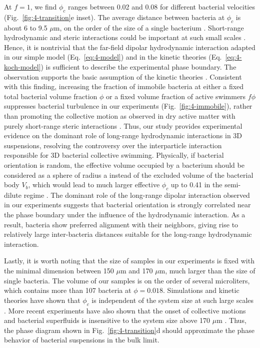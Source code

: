 At $f = 1$, we find $\phi_c$ ranges between 0.02 and 0.08 for different bacterial velocities (Fig.~\ref{fig:4-transition}e inset). The average distance between bacteria at $\phi_c$ is about 6 to 9.5 $\mu$m, on the order of the size of a single bacterium \cite{Berg2004}. Short-range hydrodynamic and steric interactions could be important at such small scales \cite{Aranson2007, Ezhilan2013}. Hence, it is nontrivial that the far-field dipolar hydrodynamic interaction adapted in our simple model (Eq.~\ref{eq:4-model}) and in the kinetic theories (Eq.~\ref{eq:4-koch-model}) is sufficient to describe the experimental phase boundary.
The observation supports the basic assumption of the kinetic theories \cite{Koch2011, Saintillan2015}. Consistent with this finding, increasing the fraction of immobile bacteria at either a fixed total bacterial volume fraction $\phi$ or a fixed volume fraction of active swimmers $f\phi$ suppresses bacterial turbulence in our experiments (Fig.~\ref{fig:4-immobile}), rather than promoting the collective motion as observed in dry active matter with purely short-range steric interactions \cite{Kumar2014}. Thus, our study provides experimental evidence on the dominant role of long-range hydrodynamic interactions in 3D suspensions, resolving the controversy over the interparticle interaction responsible for 3D bacterial collective swimming. Physically, if bacterial orientation is random, the effective volume occupied by a bacterium should be considered as a sphere of radius a instead of the excluded volume of the bacterial body $V_b$, which would lead to much larger effective $\phi_c$ up to 0.41 in the semi-dilute regime \cite{Cisneros2011}. The dominant role of the long-range dipolar interaction observed in our experiments suggests that bacterial orientation is strongly correlated near the phase boundary under the influence of the hydrodynamic interaction. As a result, bacteria show preferred alignment with their neighbors, giving rise to relatively large inter-bacteria distances suitable for the long-range hydrodynamic interaction.

Lastly, it is worth noting that the size of samples in our experiments is fixed with the minimal dimension between 150 $\mu$m and 170 $\mu$m, much larger than the size of single bacteria. The volume of our samples is on the order of several microliters, which contains more than 107 bacteria at $\phi = 0.018$. Simulations and kinetic theories have shown that $\phi_c$ is independent of the system size at such large scales \cite{Stenhammar2017}. More recent experiments have also shown that the onset of collective motions and bacterial superfluids is insensitive to the system size above 170 $\mu$m \cite{Martinez2020}. Thus, the phase diagram shown in Fig.~\ref{fig:4-transition}d should approximate the phase behavior of bacterial suspensions in the bulk limit.


